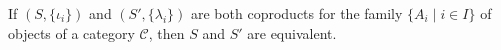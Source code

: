 \begin{theorem}
If $(S, \{\iota_i\})$ and $(S', \{\lambda_i\})$ are both coproducts for the family $\{A_i \mid i \in I\}$ of objects of a category $\mathcal{C}$, then $S$ and $S'$ are equivalent.
\end{theorem}
